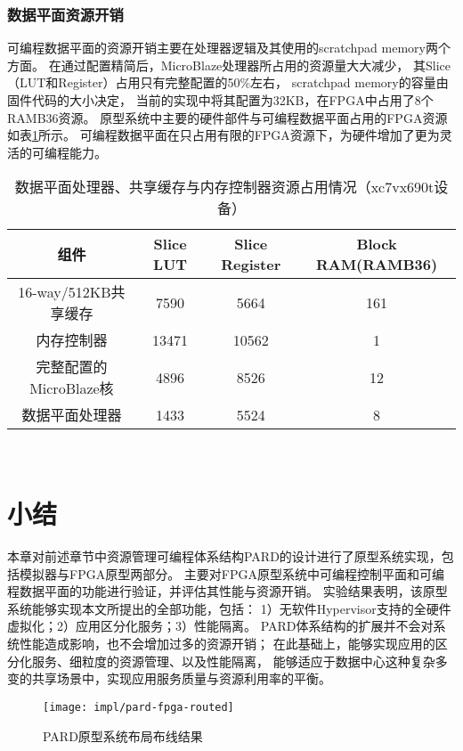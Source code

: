 \subsubsection{数据平面资源开销}

可编程数据平面的资源开销主要在处理器逻辑及其使用的scratchpad memory两个方面。
在通过配置精简后，MicroBlaze处理器所占用的资源量大大减少，
其Slice（LUT和Register）占用只有完整配置的50\%左右，
scratchpad memory的容量由固件代码的大小决定，
当前的实现中将其配置为32KB，在FPGA中占用了8个RAMB36资源。
原型系统中主要的硬件部件与可编程数据平面占用的FPGA资源如表\ref{tab:pard-dp-resource}所示。
可编程数据平面在只占用有限的FPGA资源下，为硬件增加了更为灵活的可编程能力。

\begin{table}[htb]
  \centering
  \begin{minipage}[t]{0.9\linewidth}
  \caption{数据平面处理器、共享缓存与内存控制器资源占用情况（xc7vx690t设备）}
  \label{tab:pard-dp-resource}
    \begin{tabular*}{\linewidth}{cccc}
      \toprule[1.5pt]
      \textbf{组件} & \textbf{Slice LUT} & \textbf{Slice Register} & \textbf{Block RAM(RAMB36)} \\
      \midrule[1pt]
      16-way/512KB共享缓存    &  7590       &  5664            &  161               \\
      内存控制器              &  13471      &  10562           &  1                 \\
      完整配置的MicroBlaze核  &  4896       &  8526            &  12                \\
      \hline
      数据平面处理器          &  1433       &  5524            &  8                 \\
      \bottomrule[1.5pt]
    \end{tabular*}\\[2pt]
  \end{minipage}
\end{table}


\section{小结}

本章对前述章节中资源管理可编程体系结构PARD的设计进行了原型系统实现，包括模拟器与FPGA原型两部分。
主要对FPGA原型系统中可编程控制平面和可编程数据平面的功能进行验证，并评估其性能与资源开销。
实验结果表明，该原型系统能够实现本文所提出的全部功能，包括：
1）无软件Hypervisor支持的全硬件虚拟化；2）应用区分化服务；3）性能隔离。
PARD体系结构的扩展并不会对系统性能造成影响，也不会增加过多的资源开销；
在此基础上，能够实现应用的区分化服务、细粒度的资源管理、以及性能隔离，
能够适应于数据中心这种复杂多变的共享场景中，实现应用服务质量与资源利用率的平衡。


\begin{figure}[htb]
  \centering
  \texttt{[image: impl/pard-fpga-routed]}
  \caption{PARD原型系统布局布线结果}
  \label{fig:pard-fpga-routed}
\end{figure}
